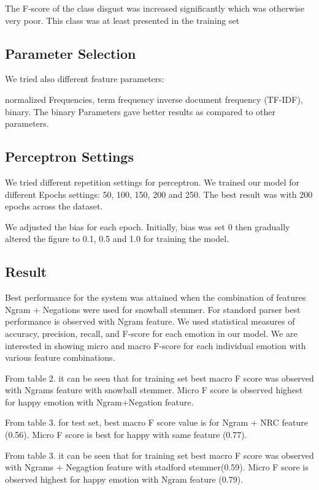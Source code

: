\documentclass[11pt]{article}
\begin{document}
  
  The F-score of the class disgust was increased significantly which was otherwise very poor. This class was at least presented in the training set
  
  \subsection{Parameter Selection}
  
  
  We tried also different feature parameters:
  
  
  normalized Frequencies, term frequency inverse document frequency (TF-IDF), binary. The binary Parameters gave better results as compared to other
  parameters.
  
  
  \subsection{Perceptron Settings}
  We tried different repetition settings for perceptron. We trained our model for different Epochs settings:
  50, 100, 150, 200 and 250. The best result was with 200 epochs across the dataset.
  
  We adjusted the bias for each epoch. Initially, bias was set 0 then gradually altered the figure to 0.1, 0.5 and 1.0 for training the model.
  
  \subsection{Result}
  
  Best performance for the system was attained when the combination of features Ngram + Negations were used for snowball stemmer.
  For standord parser best performance is observed with Ngram feature. We used statistical measures of accuracy, precision, recall, and F-score for each emotion in our model. We are interested in showing micro and macro F-score for each individual emotion with  various feature combinations.
  
   
  From table 2. it can be seen that for training set best macro F score was observed with Ngrams feature with snowball stemmer. Micro F score is observed highest for happy emotion with Ngram+Negation feature. 
  
  From table 3. for test set, best macro F score value is for Ngram +  NRC feature (0.56). Micro F score is best for happy with same feature (0.77).
  
  From table 3. it can be seen that for training set best macro F score was observed with Ngrams + Negagtion feature with stadford stemmer(0.59). Micro F score is observed highest for happy emotion with Ngram feature (0.79). 
  
\end{document}

